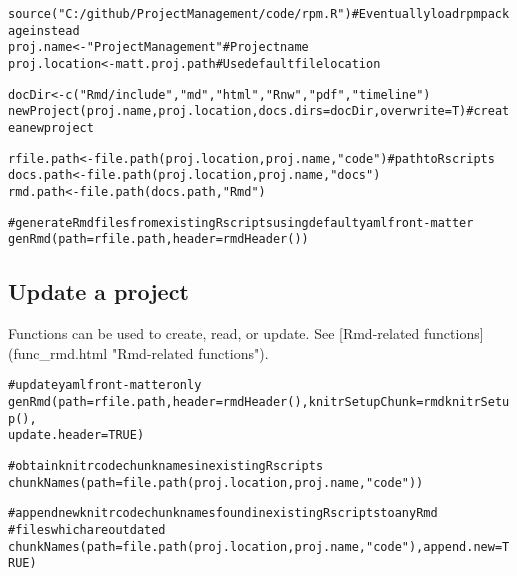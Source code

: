 \documentclass{article}\usepackage[]{graphicx}\usepackage[]{color}
\makeatletter
\newcommand{\hlnum}[1]{\textcolor[rgb]{0.863,0.196,0.184}{#1}}%
\newcommand{\hlstr}[1]{\textcolor[rgb]{0.863,0.196,0.184}{#1}}%
\newcommand{\hlcom}[1]{\textcolor[rgb]{0.345,0.431,0.459}{#1}}%
\newcommand{\hlstd}[1]{\textcolor[rgb]{0.514,0.58,0.588}{#1}}%
\newcommand{\hlkwb}[1]{\textcolor[rgb]{0.522,0.6,0}{#1}}%
\newcommand{\hlkwc}[1]{\textcolor[rgb]{0.796,0.294,0.086}{#1}}%
\newcommand{\hlkwd}[1]{\textcolor[rgb]{0.576,0.631,0.631}{#1}}%
\newenvironment{kframe}{%
 \def\at@end@of@kframe{}%
 \ifinner\ifhmode%
  \def\at@end@of@kframe{\end{minipage}}%
  \begin{minipage}{\columnwidth}%
 \fi\fi%
 \def\FrameCommand##1{\hskip\@totalleftmargin \hskip-\fboxsep
 \colorbox{shadecolor}{##1}\hskip-\fboxsep
     \hskip-\linewidth \hskip-\@totalleftmargin \hskip\columnwidth}%
 \MakeFramed {\advance\hsize-\width
   \@totalleftmargin\z@ \linewidth\hsize
   \@setminipage}}%
 {\par\unskip\endMakeFramed%
 \at@end@of@kframe}
\newenvironment{knitrout}{}{} %
\makeatother
\begin{document}
\begin{knitrout}
\color{fgcolor}\begin{kframe}
\begin{alltt}
\hlkwd{source}\hlstd{(}\hlstr{"C:/github/ProjectManagement/code/rpm.R"}\hlstd{)}  \hlcom{# Eventually load rpm package instead}
\hlstd{proj.name} \hlkwb{<-} \hlstr{"ProjectManagement"}  \hlcom{# Project name}
\hlstd{proj.location} \hlkwb{<-} \hlstd{matt.proj.path}  \hlcom{# Use default file location}

\hlstd{docDir} \hlkwb{<-} \hlkwd{c}\hlstd{(}\hlstr{"Rmd/include"}\hlstd{,} \hlstr{"md"}\hlstd{,} \hlstr{"html"}\hlstd{,} \hlstr{"Rnw"}\hlstd{,} \hlstr{"pdf"}\hlstd{,} \hlstr{"timeline"}\hlstd{)}
\hlkwd{newProject}\hlstd{(proj.name, proj.location,} \hlkwc{docs.dirs} \hlstd{= docDir,} \hlkwc{overwrite} \hlstd{= T)}  \hlcom{# create a new project}

\hlstd{rfile.path} \hlkwb{<-} \hlkwd{file.path}\hlstd{(proj.location, proj.name,} \hlstr{"code"}\hlstd{)}  \hlcom{# path to R scripts}
\hlstd{docs.path} \hlkwb{<-} \hlkwd{file.path}\hlstd{(proj.location, proj.name,} \hlstr{"docs"}\hlstd{)}
\hlstd{rmd.path} \hlkwb{<-} \hlkwd{file.path}\hlstd{(docs.path,} \hlstr{"Rmd"}\hlstd{)}

\hlcom{# generate Rmd files from existing R scripts using default yaml front-matter}
\hlkwd{genRmd}\hlstd{(}\hlkwc{path} \hlstd{= rfile.path,} \hlkwc{header} \hlstd{=} \hlkwd{rmdHeader}\hlstd{())}
\end{alltt}
\end{kframe}
\end{knitrout}

\subsection{Update a project}
Functions can be used to create, read, or update. See [Rmd-related functions](func\_rmd.html "Rmd-related functions").

\begin{knitrout}
\color{fgcolor}\begin{kframe}
\begin{alltt}
\hlcom{# update yaml front-matter only}
\hlkwd{genRmd}\hlstd{(}\hlkwc{path} \hlstd{= rfile.path,} \hlkwc{header} \hlstd{=} \hlkwd{rmdHeader}\hlstd{(),} \hlkwc{knitrSetupChunk} \hlstd{=} \hlkwd{rmdknitrSetup}\hlstd{(),}
    \hlkwc{update.header} \hlstd{=} \hlnum{TRUE}\hlstd{)}

\hlcom{# obtain knitr code chunk names in existing R scripts}
\hlkwd{chunkNames}\hlstd{(}\hlkwc{path} \hlstd{=} \hlkwd{file.path}\hlstd{(proj.location, proj.name,} \hlstr{"code"}\hlstd{))}

\hlcom{# append new knitr code chunk names found in existing R scripts to any Rmd}
\hlcom{# files which are outdated}
\hlkwd{chunkNames}\hlstd{(}\hlkwc{path} \hlstd{=} \hlkwd{file.path}\hlstd{(proj.location, proj.name,} \hlstr{"code"}\hlstd{),} \hlkwc{append.new} \hlstd{=} \hlnum{TRUE}\hlstd{)}
\end{alltt}
\end{kframe}
\end{knitrout}
\end{document}
